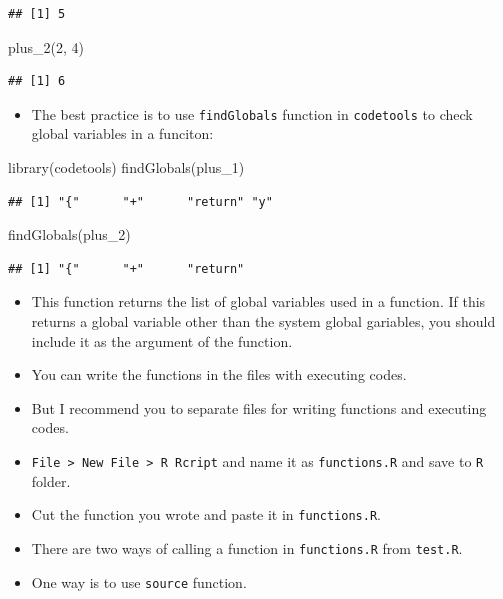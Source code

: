 \documentclass[
]{book}
\newenvironment{Shaded}{\begin{snugshade}}{\end{snugshade}}
\newcommand{\DecValTok}[1]{\textcolor[rgb]{0.00,0.00,0.81}{#1}}
\newcommand{\FunctionTok}[1]{\textcolor[rgb]{0.00,0.00,0.00}{#1}}
\newcommand{\NormalTok}[1]{#1}
\providecommand{\tightlist}{%
  \setlength{\itemsep}{0pt}\setlength{\parskip}{0pt}}
\begin{document}
\begin{verbatim}
## [1] 5
\end{verbatim}

\begin{Shaded}
\begin{Highlighting}[]
\FunctionTok{plus\_2}\NormalTok{(}\DecValTok{2}\NormalTok{, }\DecValTok{4}\NormalTok{)}
\end{Highlighting}
\end{Shaded}

\begin{verbatim}
## [1] 6
\end{verbatim}

\begin{itemize}
\tightlist
\item
  The best practice is to use \texttt{findGlobals} function in \texttt{codetools} to check global variables in a funciton:
\end{itemize}

\begin{Shaded}
\begin{Highlighting}[]
\FunctionTok{library}\NormalTok{(codetools)}
\FunctionTok{findGlobals}\NormalTok{(plus\_1)}
\end{Highlighting}
\end{Shaded}

\begin{verbatim}
## [1] "{"      "+"      "return" "y"
\end{verbatim}

\begin{Shaded}
\begin{Highlighting}[]
\FunctionTok{findGlobals}\NormalTok{(plus\_2)}
\end{Highlighting}
\end{Shaded}

\begin{verbatim}
## [1] "{"      "+"      "return"
\end{verbatim}

\begin{itemize}
\item
  This function returns the list of global variables used in a function. If this returns a global variable other than the system global gariables, you should include it as the argument of the function.
\item
  You can write the functions in the files with executing codes.
\item
  But I recommend you to separate files for writing functions and executing codes.
\item
  \texttt{File\ \textgreater{}\ New\ File\ \textgreater{}\ R\ Rcript} and name it as \texttt{functions.R} and save to \texttt{R} folder.
\item
  Cut the function you wrote and paste it in \texttt{functions.R}.
\item
  There are two ways of calling a function in \texttt{functions.R} from \texttt{test.R}.
\item
  One way is to use \texttt{source} function.
\end{itemize}
\end{document}
